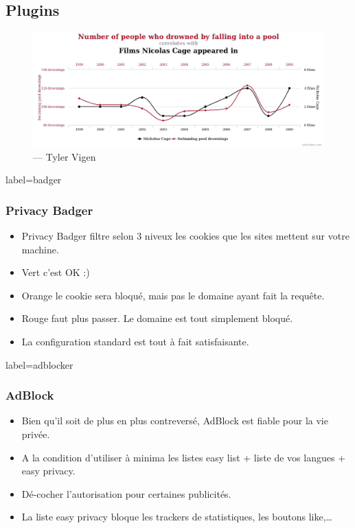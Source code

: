 \documentclass{beamer}
\begin{document}
    \subsection{Plugins}
        \begin{frame}
            \begin{center}
                \begin{figure}
                    \includegraphics[scale=0.15]{img/data_science.jpg}
                    \caption{\cc --- Tyler Vigen}
                \end{figure}
            \end{center}
        \end{frame}
        \begin{frame}{label=badger}
            \frametitle{Privacy Badger}
            \begin{center}
                \begin{itemize}
                    \item Privacy Badger filtre selon 3 niveux les cookies que les sites mettent sur votre machine.
                    \item Vert c'est OK :)
                    \item Orange le cookie sera bloqué, mais pas le domaine ayant fait la requête.
                    \item Rouge faut plus passer. Le domaine est tout simplement bloqué.
                    \item La configuration standard est tout à fait satisfaisante.
                \end{itemize}
            \end{center}
        \end{frame}
        \begin{frame}{label=adblocker}
            \frametitle{AdBlock}
            \begin{center}
                \begin{itemize}
                    \item Bien qu'il soit de plus en plus contreversé, AdBlock est fiable pour la vie privée.
                    \item A la condition d'utiliser à minima les listes easy list + liste de vos langues + easy privacy.
                    \item Dé-cocher l'autorisation pour certaines publicités.
                    \item La liste easy privacy bloque les trackers de statistiques, les boutons like,\ldots
                \end{itemize}
            \end{center}
        \end{frame}
\end{document}
